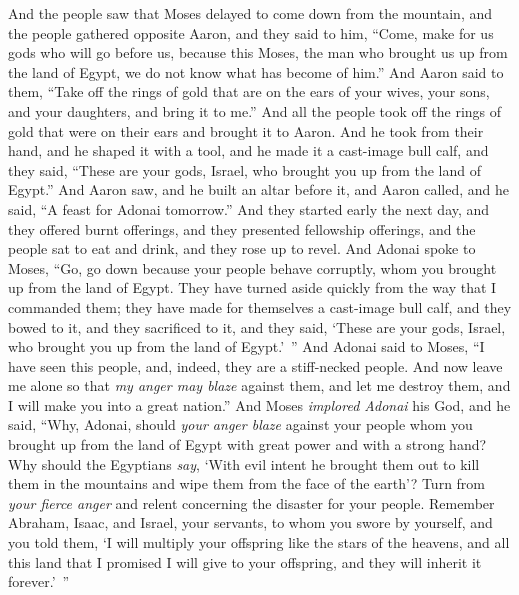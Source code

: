 \begin{biblechapter} %
 And the people saw that Moses delayed to come down from the mountain, and the people gathered opposite Aaron, and they said to him, “Come, make for us gods who will go before us, because this Moses, the man who brought us up from the land of Egypt, we do not know what has become of him.”
\verse And Aaron said to them, “Take off the rings of gold that are on the ears of your wives, your sons, and your daughters, and bring it to me.”
\verse And all the people took off the rings of gold that were on their ears and brought it to Aaron.
\verse And he took from their hand, and he shaped it with a tool, and he made it a cast-image bull calf, and they said, “These are your gods, Israel, who brought you up from the land of Egypt.”
\verse And Aaron saw, and he built an altar before it, and Aaron called, and he said, “A feast for Adonai tomorrow.”
\verse And they started early the next day, and they offered burnt offerings, and they presented fellowship offerings, and the people sat to eat and drink, and they rose up to revel.
\verse And Adonai spoke to Moses, “Go, go down because your people behave corruptly, whom you brought up from the land of Egypt.
\verse They have turned aside quickly from the way that I commanded them; they have made for themselves a cast-image bull calf, and they bowed to it, and they sacrificed to it, and they said, ‘These are your gods, Israel, who brought you up from the land of Egypt.’ ”
\verse And Adonai said to Moses, “I have seen this people, and, indeed, they are a stiff-necked people.
\verse And now leave me alone so that \textit{my anger may blaze} against them, and let me destroy them, and I will make you into a great nation.”
\verse And Moses \textit{implored Adonai} his God, and he said, “Why, Adonai, should \textit{your anger blaze} against your people whom you brought up from the land of Egypt with great power and with a strong hand?
\verse Why should the Egyptians \textit{say}, ‘With evil intent he brought them out to kill them in the mountains and wipe them from the face of the earth’? Turn from \textit{your fierce anger} and relent concerning the disaster for your people.
\verse Remember Abraham, Isaac, and Israel, your servants, to whom you swore by yourself, and you told them, ‘I will multiply your offspring like the stars of the heavens, and all this land that I promised I will give to your offspring, and they will inherit it forever.’ ”

\end{biblechapter}
